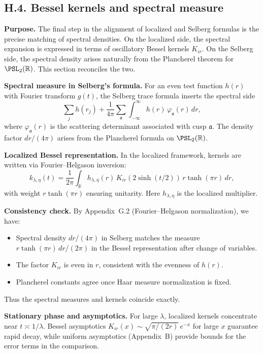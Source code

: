 \subsection*{H.4. Bessel kernels and spectral measure}
\label{appH:bessel}

\noindent\textbf{Purpose.}
The final step in the alignment of localized and Selberg formulas is the precise 
matching of spectral densities. On the localized side, the spectral expansion is 
expressed in terms of oscillatory Bessel kernels $K_{ir}$. On the Selberg side, 
the spectral density arises naturally from the Plancherel theorem for 
$\PSL_2(\mathbb R)$. This section reconciles the two.

\medskip
\noindent\textbf{Spectral measure in Selberg’s formula.}
For an even test function $h(r)$ with Fourier transform $g(t)$, the Selberg trace 
formula inserts the spectral side
\[
\sum_j h(r_j) + \frac{1}{4\pi} \sum_{\mathfrak a} 
\int_{-\infty}^\infty h(r)\,\varphi_{\mathfrak a}(r)\,dr,
\]
where $\varphi_{\mathfrak a}(r)$ is the scattering determinant associated with cusp $\mathfrak a$.  
The density factor $dr/(4\pi)$ arises from the Plancherel formula on $\PSL_2(\mathbb R)$.

\medskip
\noindent\textbf{Localized Bessel representation.}
In the localized framework, kernels are written via Fourier–Helgason inversion:
\[
k_{\lambda,\eta}(t) = \frac{1}{2\pi} \int_\mathbb{R} h_{\lambda,\eta}(r)\,K_{ir}(2\sinh(t/2))\, r \tanh(\pi r)\,dr,
\]
with weight $r\tanh(\pi r)$ ensuring unitarity. Here $h_{\lambda,\eta}$ is the localized multiplier.

\medskip
\noindent\textbf{Consistency check.}
By Appendix~G.2 (Fourier–Helgason normalization), we have:
\begin{itemize}
  \item Spectral density $dr/(4\pi)$ in Selberg matches the measure $r\tanh(\pi r)\,dr/(2\pi)$ 
        in the Bessel representation after change of variables.
  \item The factor $K_{ir}$ is even in $r$, consistent with the evenness of $h(r)$.
  \item Plancherel constants agree once Haar measure normalization is fixed.
\end{itemize}
Thus the spectral measures and kernels coincide exactly.

\medskip
\noindent\textbf{Stationary phase and asymptotics.}
For large $\lambda$, localized kernels concentrate near $t\asymp 1/\lambda$.  
Bessel asymptotics $K_{ir}(x)\sim\sqrt{\pi/(2r)}\,e^{-x}$ for large $x$ 
guarantee rapid decay, while uniform asymptotics (Appendix~B) provide bounds for 
the error terms in the comparison.

